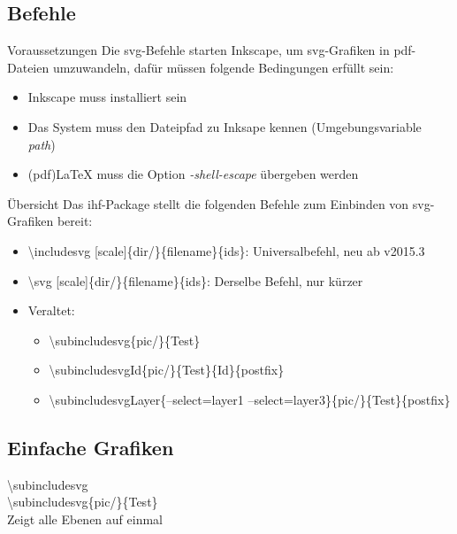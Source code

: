 \documentclass[student]{ihfBeamer} %
\begin{document}
\subsection{Befehle}

\begin{frame}{Voraussetzungen}
Die svg-Befehle starten Inkscape, um svg-Grafiken in pdf-Dateien umzuwandeln, dafür müssen folgende Bedingungen erfüllt sein:\\
\begin{itemize}
\item Inkscape muss installiert sein
\item Das System muss den Dateipfad zu Inksape kennen (Umgebungsvariable \textit{path})
\item (pdf)\LaTeX{} muss die Option \textit{-shell-escape} übergeben werden
\end{itemize}
\end{frame}

\begin{frame}{Übersicht}
Das ihf-Package stellt die folgenden Befehle zum Einbinden von svg-Grafiken bereit:\\
\begin{itemize}
\item \textbackslash includesvg [scale]\{dir/\}\{filename\}\{ids\}: Universalbefehl, neu ab v2015.3
\item \textbackslash svg [scale]\{dir/\}\{filename\}\{ids\}: Derselbe Befehl, nur kürzer
\item Veraltet:
\begin{itemize}
\item \textbackslash subincludesvg\{pic/\}\{Test\}
\item \textbackslash subincludesvgId\{pic/\}\{Test\}\{Id\}\{postfix\}
\item \textbackslash subincludesvgLayer\{--select=layer1 --select=layer3\}\{pic/\}\{Test\}\{postfix\}
\end{itemize}
\end{itemize}
\end{frame}

\subsection{Einfache Grafiken}

\begin{frame}{\textbackslash subincludesvg}
\\
\textbackslash subincludesvg\{pic/\}\{Test\}\\
Zeigt alle Ebenen auf einmal
\end{frame}
\end{document}
